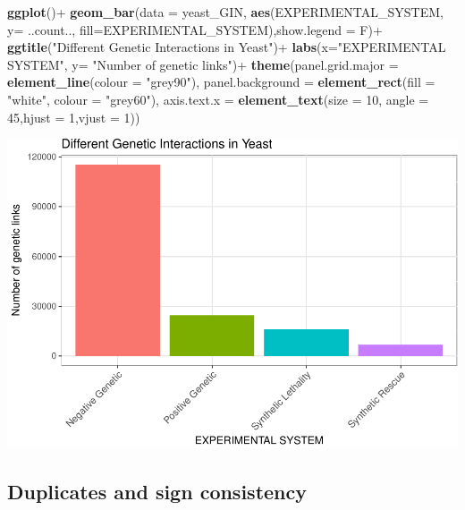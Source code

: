 \documentclass[12pt,]{article}
\newenvironment{Shaded}{\begin{snugshade}}{\end{snugshade}}
\newcommand{\KeywordTok}[1]{\textcolor[rgb]{0.13,0.29,0.53}{\textbf{{#1}}}}
\newcommand{\DataTypeTok}[1]{\textcolor[rgb]{0.13,0.29,0.53}{{#1}}}
\newcommand{\DecValTok}[1]{\textcolor[rgb]{0.00,0.00,0.81}{{#1}}}
\newcommand{\StringTok}[1]{\textcolor[rgb]{0.31,0.60,0.02}{{#1}}}
\newcommand{\NormalTok}[1]{{#1}}
\begin{document}
\begin{Shaded}
\begin{Highlighting}[]
\KeywordTok{ggplot}\NormalTok{()+}
\StringTok{  }\KeywordTok{geom_bar}\NormalTok{(}\DataTypeTok{data =} \NormalTok{yeast_GIN, }\KeywordTok{aes}\NormalTok{(EXPERIMENTAL_SYSTEM, }\DataTypeTok{y=} \NormalTok{..count.., }\DataTypeTok{fill=}\NormalTok{EXPERIMENTAL_SYSTEM),}\DataTypeTok{show.legend =} \NormalTok{F)+}
\StringTok{  }\KeywordTok{ggtitle}\NormalTok{(}\StringTok{"Different Genetic Interactions in Yeast"}\NormalTok{)+}
\StringTok{  }\KeywordTok{labs}\NormalTok{(}\DataTypeTok{x=}\StringTok{"EXPERIMENTAL SYSTEM"}\NormalTok{, }\DataTypeTok{y=} \StringTok{"Number of genetic links"}\NormalTok{)+}
\StringTok{  }\KeywordTok{theme}\NormalTok{(}\DataTypeTok{panel.grid.major =} \KeywordTok{element_line}\NormalTok{(}\DataTypeTok{colour =} \StringTok{"grey90"}\NormalTok{), }\DataTypeTok{panel.background =} \KeywordTok{element_rect}\NormalTok{(}\DataTypeTok{fill =} \StringTok{"white"}\NormalTok{, }\DataTypeTok{colour =} \StringTok{"grey60"}\NormalTok{),}
        \DataTypeTok{axis.text.x =} \KeywordTok{element_text}\NormalTok{(}\DataTypeTok{size  =} \DecValTok{10}\NormalTok{, }\DataTypeTok{angle =} \DecValTok{45}\NormalTok{,}\DataTypeTok{hjust =} \DecValTok{1}\NormalTok{,}\DataTypeTok{vjust =} \DecValTok{1}\NormalTok{))}
\end{Highlighting}
\end{Shaded}

\includegraphics{yeast_GIN_files/figure-latex/unnamed-chunk-4-1.pdf}

\subsection{Duplicates and sign
consistency}\label{duplicates-and-sign-consistency}
\end{document}
